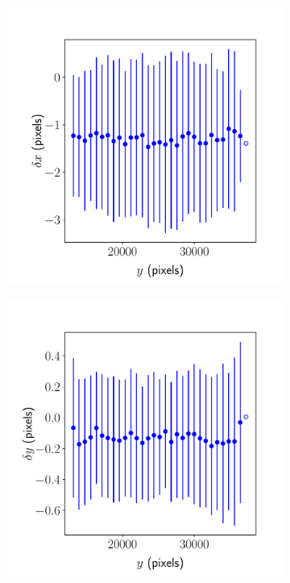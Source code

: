 \documentclass{article}
\begin{document}
\begin{figure}[ht]
\begin{subfigure}{0.24\linewidth}
		\caption{}
		\label{fig:sinewave4yxJHUPolaris}
	\end{subfigure}
	\begin{subfigure}{0.24\linewidth}
		\includegraphics[width=\linewidth]{sine-wave-4-xy-JHUPolaris.pdf}
		\caption{}
		\label{fig:sinewave4xyJHUPolaris}
	\end{subfigure}
	\begin{subfigure}{0.24\linewidth}
		\includegraphics[width=\linewidth]{sine-wave-4-yy-JHUPolaris.pdf}

\end{subfigure}
\end{figure}
\end{document}
